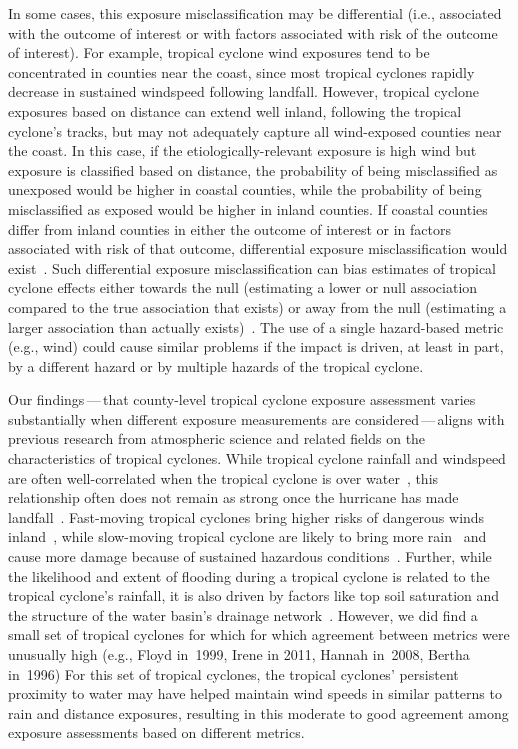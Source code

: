 In some cases, this exposure misclassification may be differential (i.e.,
associated with the outcome of interest or with factors associated with risk of
the outcome of interest). For example, tropical cyclone wind exposures tend to
be concentrated in counties near the coast, since most tropical cyclones
rapidly decrease in sustained windspeed following landfall. However, tropical
cyclone exposures based on distance can extend well inland, following the
tropical cyclone's tracks, but may not adequately capture all wind-exposed
counties near the coast. In this case, if the etiologically-relevant exposure
is high wind but exposure is classified based on distance, the probability of
being misclassified as unexposed would be higher in coastal counties, while the
probability of being misclassified as exposed would be higher in inland
counties. If coastal counties differ from inland counties in either the outcome
of interest or in factors associated with risk of that outcome, differential
exposure misclassification would exist~\citep{savitz2016interpreting}. Such
differential exposure misclassification can bias estimates of tropical cyclone
effects either towards the null (estimating a lower or null association
compared to the true association that exists) or away from the null (estimating
a larger association than actually exists)~\citep{savitz2016interpreting,
armstrong1998effect}. The use of a single hazard-based metric (e.g., wind)
could cause similar problems if the impact is driven, at least in part, by a
different hazard or by multiple hazards of the tropical cyclone.

Our findings\,---\,that county-level tropical cyclone exposure assessment varies
substantially when different exposure measurements are considered\,---\,aligns with
previous research from atmospheric science and related fields on the
characteristics of tropical cyclones. While tropical cyclone rainfall and
windspeed are often well-correlated when the tropical cyclone is over
water~\citep{cerveny2000}, this relationship often does not remain as strong
once the hurricane has made landfall~\citep{jiang2008}.  Fast-moving tropical
cyclones bring higher risks of dangerous winds inland~\citep{kruk2010}, while
slow-moving tropical cyclone are likely to bring more
rain~\citep{rappaport2000} and cause more damage because of sustained hazardous
conditions~\citep{rezapour2014}. Further, while the likelihood and extent of
flooding during a tropical cyclone is related to the tropical cyclone's
rainfall, it is also driven by factors like top soil saturation and the
structure of the water basin's drainage network~\citep{chen2015, rees2001}.
However, we did find a small set of tropical cyclones for which for which
agreement between metrics were unusually high (e.g., Floyd in~1999, Irene in
2011, Hannah in~2008, Bertha in~1996) For this set of tropical cyclones, the
tropical cyclones' persistent proximity to water may have helped maintain wind
speeds in similar patterns to rain and distance exposures, resulting in this
moderate to good agreement among exposure assessments based on different
metrics. 

